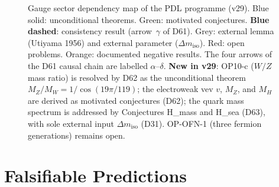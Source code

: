 \documentclass[11pt,a4paper]{article}
\theoremstyle{plain}
\theoremstyle{definition}
\theoremstyle{remark}
\begin{document}
\begin{figure}[H]
{%
}
\caption{Gauge sector dependency map of the PDL programme (v29). \textcolor{proofblue}{Blue solid}: unconditional theorems. \textcolor{conjecturegreen}{Green}: motivated conjectures. \textbf{Blue dashed}: consistency result (arrow~$\gamma$ of D61). Grey: external lemma (Utiyama 1956) and external parameter ($\Delta m_{\mathrm{iso}}$). \textcolor{openproblemred}{Red}: open problems. Orange: documented negative results. The four arrows of the D61 causal chain are labelled $\alpha$--$\delta$. \textbf{New in v29}: OP10-c ($W/Z$ mass ratio) is resolved by D62 as the unconditional theorem $M_Z/M_W = 1/\cos(19\pi/119)$; the electroweak vev $v$, $M_Z$, and $M_H$ are derived as motivated conjectures (D62); the quark mass spectrum is addressed by Conjectures H\_mass and H\_sea (D63), with sole external input $\Delta m_{\mathrm{iso}}$ (D31). OP-OFN-1 (three fermion generations) remains open.}
\label{fig:dependency_gauge}
\end{figure}

\newpage

\section{Falsifiable Predictions}
\label{sec:predictions}
\end{document}
